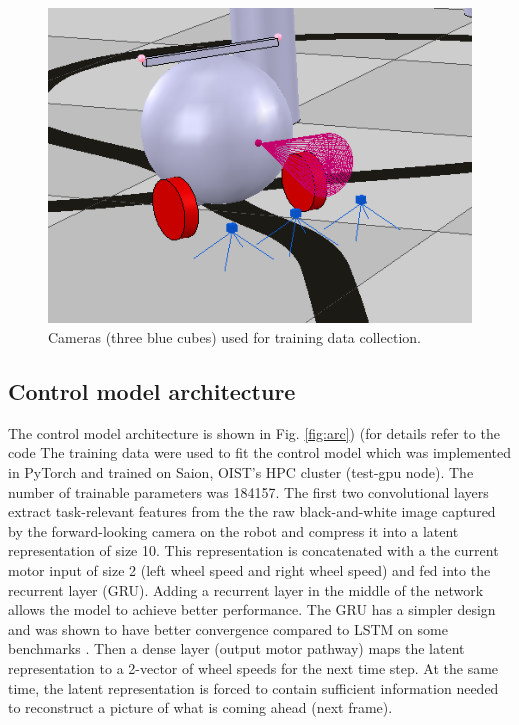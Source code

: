 \documentclass[11pt, oneside]{article}   	%
\begin{document}
\begin{figure}[h]
\includegraphics[width=\columnwidth]{Fig_2} 
\caption{Cameras (three blue cubes) used for training data collection.}
\label{fig:cams}
\end{figure}

\subsection{Control model architecture}

The control model architecture is shown in Fig. \ref{fig:arc}) (for details refer to the code  The training data were used to fit the control model which was implemented in PyTorch and trained on Saion, OIST's HPC cluster (test-gpu node). The number of trainable parameters was 184157. The first two convolutional layers extract task-relevant features from the the raw black-and-white image captured by the forward-looking camera on the robot and compress it into a latent representation of size 10. This representation is concatenated with a the current motor input of size 2 (left wheel speed and right wheel speed) and fed into the recurrent layer (GRU). Adding a recurrent layer in the middle of the network allows the model to achieve better performance. The GRU has a simpler design and was shown to have better convergence compared to LSTM on some benchmarks \cite{Chung2015}. Then a dense layer (output motor pathway) maps the latent representation to a 2-vector of wheel speeds for the next time step. At the same time, the latent representation is forced to  contain sufficient information needed to reconstruct a picture of what is coming ahead (next frame). 
\end{document}

